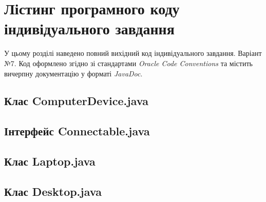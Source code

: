 \section{Лістинг програмного коду індивідуального завдання}

У цьому розділі наведено повний вихідний код індивідуального завдання. Варіант №7. 
Код оформлено згідно зі стандартами \textit{Oracle Code Conventions} та містить 
вичерпну документацію у форматі \textit{JavaDoc}.
\subsection{Клас ComputerDevice.java}

\newpage %
\subsection{Інтерфейс Connectable.java}

\newpage %
\subsection{Клас Laptop.java}

\newpage %
\subsection{Клас Desktop.java}
